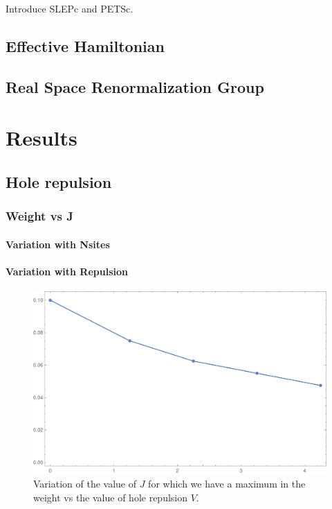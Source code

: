 \documentclass[ openright,titlepage,numbers=noenddot,headinclude,twoside,%
                footinclude=true,cleardoublepage=empty,abstractoff,%
                BCOR=5mm,paper=a4,fontsize=11pt,%
                ngerman,american,%
]{scrreprt}
\begin{document}
Introduce SLEPc and PETSc.

\section{Effective Hamiltonian}

\section{Real Space Renormalization Group}

\chapter{Results}

\section{Hole repulsion}


\subsection{Weight vs J}
\subsubsection{Variation with Nsites}
\subsubsection{Variation with Repulsion}

\begin{figure}[ht]
    \centering
    \includegraphics[scale=0.5]{12_4h_J_wmax_vs_xrep.pdf}
    \caption{\label{fig:}Variation of the value of $J$ for which we have a maximum in the weight vs the value of hole repulsion $V$. }
\end{figure}
\end{document}
